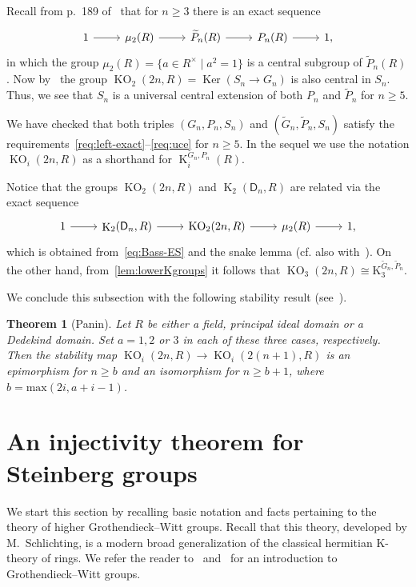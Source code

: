 \documentclass[10pt,a4paper,twoside]{article}
\newtheorem{externaltheorem}[lemma]{Theorem}
\theoremstyle{remark}
\theoremstyle{definition}
\numberwithin{lemma}{section}
\numberwithin{prop}{section}
\numberwithin{corollary}{section}
\numberwithin{externaltheorem}{section}
\DeclareMathOperator{\Ker}{Ker}
\DeclareMathOperator{\K}{K}
\DeclareMathOperator{\KO}{KO}
\newcommand{\rD}{\mathsf{D}}
\numberwithin{equation}{section}
\begin{document}
Recall from p.~189 of~\cite{Ba74} that for $n\geq 3$ there is an exact sequence
\begin{equation}\label{eq:Bass-ES} \begin{tikzcd} 1 \arrow{r} & \mu_2(R) \arrow{r} & \widetilde{P}_n(R) \arrow{r} & P_n(R) \arrow{r} & 1, \end{tikzcd} \end{equation}
in which the group $\mu_2(R) = \{ a \in R^\times \mid a^2 = 1 \}$ is a central subgroup of $\widetilde{P}_n(R)$.
Now by~\cite[\S~7(v)]{St67} the group $\KO_2(2n, R) = \Ker(S_n \to G_n)$ is also central in $S_n$.
Thus, we see that $S_n$ is a universal central extension of both $P_n$ and $\widetilde{P}_n$ for $n\geq 5$.

We have checked that both triples $(G_n, P_n, S_n)$ and $(\widetilde{G}_n, \widetilde{P}_n, S_n)$ satisfy the requirements~\ref{req:left-exact}--\ref{req:uce} for $n \geq 5$. In the sequel we use the notation $\KO_i(2n, R)$ as a shorthand for $\K_i^{G_n, P_n}(R)$. 

Notice that the groups $\KO_2(2n, R)$ and $\K_2(\rD_n, R)$ are related via the exact sequence
\[ \begin{tikzcd} 1 \arrow{r} & \K_2(\rD_n, R) \arrow{r} & \KO_2(2n, R) \arrow{r} & \mu_2(R) \arrow{r} & 1, \end{tikzcd} \]
which is obtained from~\eqref{eq:Bass-ES} and the snake lemma (cf. also with~\cite[Corollary~4.3.5]{Ba74}).
On the other hand, from~\cref{lem:lowerKgroups} it follows that $\KO_3(2n, R) \cong \mathrm{K}_3^{\widetilde{G}_n, \widetilde{P}_n}$.

We conclude this subsection with the following stability result (see~\cite[Theorem~9.4]{Pa89}).
\begin{externaltheorem}[Panin] \label{Panin-stability}
 Let $R$ be either a field, principal ideal domain or a Dedekind domain. Set $a = 1,2$ or $3$ in each of these three cases, respectively.
 Then the stability map $\KO_i(2n, R) \to \KO_i(2(n+1), R)$ is an epimorphism for $n \geq b$ 
 and an isomorphism for $n \geq b + 1$, where $b = \mathrm{max}(2i, a+i-1)$. \end{externaltheorem}

\section{An injectivity theorem for Steinberg groups} \label{firstPart}
We start this section by recalling basic notation and facts pertaining to the theory of higher Grothendieck--Witt groups. Recall that this theory, developed by M.~Schlichting, is a modern broad generalization of the classical hermitian K-theory of rings. We refer the reader to~\cite[\S~2]{FRS12} and~\cite[\S~2]{AF17} for an introduction to Grothendieck--Witt groups.
\end{document}
